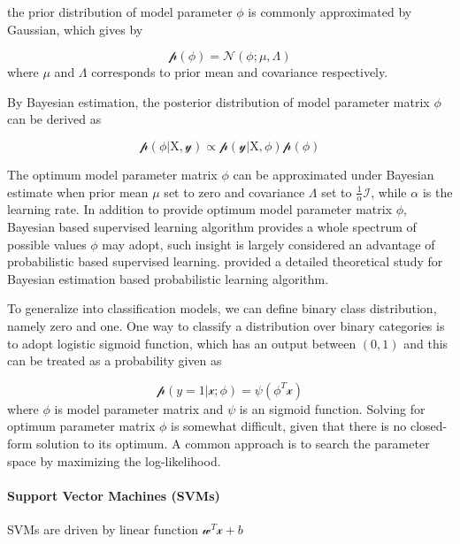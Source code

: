 the prior distribution of model parameter $\phi$ is commonly approximated by Gaussian, which gives by 

\begin{equation}
    \mathcal{p}(\phi) = \mathcal{N}(\mathcal{\phi}; \mu, \Lambda)
\end{equation}
where $\mu$ and $\Lambda$ corresponds to prior mean and covariance respectively. 

By Bayesian estimation, the posterior distribution of model parameter matrix $\phi$ can be derived as 

\begin{equation}
    \mathcal{p}(\phi|\mathrm{X},\mathcal{y}) \propto \mathcal{p}(\mathcal{y}|\mathrm{X}, \phi)\mathcal{p}(\phi)
\end{equation}

The optimum model parameter matrix $\phi$ can be approximated under Bayesian estimate when prior mean $\mu$ set to zero and covariance $\Lambda$ set to $\frac{1}{\alpha}\mathcal{I}$, while $\alpha$ is the learning rate. In addition to provide optimum model parameter matrix $\phi$, Bayesian based supervised learning algorithm provides a whole spectrum of possible values $\phi$ may adopt, such insight is largely considered an advantage of probabilistic based supervised learning. \citet{Goodfellow-et-al-2016} provided a detailed theoretical study for Bayesian estimation based probabilistic learning algorithm. 
\par 

To generalize into classification models, we can define binary class distribution, namely zero and one. One way to classify a distribution over binary categories is to adopt logistic sigmoid function, which has an output between $(0,1)$ and this can be treated as a probability given as 

\begin{equation}
    \mathcal{p}(y=1|\mathcal{x};\phi) = \psi(\phi^T\mathcal{x})
\end{equation}
where $\phi$ is model parameter matrix and $\psi$ is an sigmoid function. Solving for optimum parameter matrix $\phi$ is somewhat difficult, given that there is no closed-form solution to its optimum. A common approach is to search the parameter space by maximizing the log-likelihood. 

\paragraph{Support Vector Machines (SVMs)}
SVMs are driven by linear function $\mathcal{w}^T\mathcal{x}+b$ 

